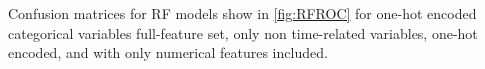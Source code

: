 Confusion matrices for RF models show in \ref{fig:RFROC} for one-hot encoded categorical variables full-feature set, only non time-related variables, one-hot encoded, and with only numerical features included.
\label{fig:RFcnfmat}